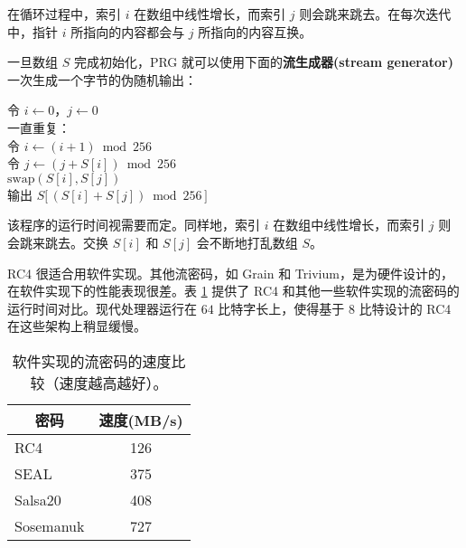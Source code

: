 在循环过程中，索引 $i$ 在数组中线性增长，而索引 $j$ 则会跳来跳去。在每次迭代中，指针 $i$ 所指向的内容都会与 $j$ 所指向的内容互换。

一旦数组 $S$ 完成初始化，PRG 就可以使用下面的\textbf{流生成器(stream generator)}一次生成一个字节的伪随机输出：

\vspace*{10pt}

\hspace*{5pt} 令 $i\leftarrow0$，$j\leftarrow0$\\
\hspace*{26pt} 一直重复：\\
\hspace*{50pt} 令 $i\leftarrow(i+1)\bmod 256$\\
\hspace*{50pt} 令 $j\leftarrow(j+S[i])\bmod 256$\\
\hspace*{50pt} $\mathrm{swap}(S[i],S[j])$ \\
\hspace*{50pt} 输出 $S\big[\,(S[i]+S[j])\bmod 256\,\big]$

\vspace*{10pt}

\noindent
该程序的运行时间视需要而定。同样地，索引 $i$ 在数组中线性增长，而索引 $j$ 则会跳来跳去。交换 $S[i]$ 和 $S[j]$ 会不断地打乱数组 $S$。

\begin{snote}[RC4 的加密速度。]
RC4 很适合用软件实现。其他流密码，如 Grain 和 Trivium，是为硬件设计的，在软件实现下的性能表现很差。表 \ref{tab:3-1} 提供了 RC4 和其他一些软件实现的流密码的运行时间对比。现代处理器运行在 $64$ 比特字长上，使得基于 $8$ 比特设计的 RC4 在这些架构上稍显缓慢。
\end{snote}

\begin{table}
  \centering
  \begin{tabular}{|l|c|}
    \hline
    \multicolumn{1}{|c|}{密码} & 速度\footnotemark[1](MB/s)\\
    \hline
    RC4 & 126\\
    SEAL & 375\\
    Salsa20 & 408\\
    Sosemanuk & 727\\
    \hline
  \end{tabular}
  \caption{软件实现的流密码的速度比较（速度越高越好）。}
  \label{tab:3-1}
\end{table}

